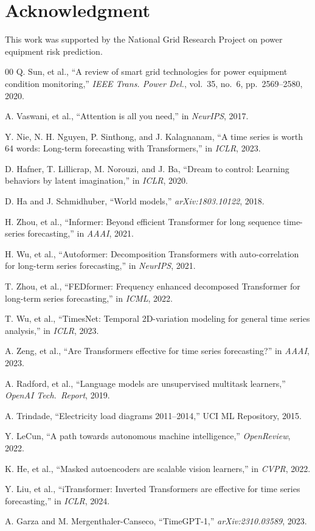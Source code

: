 \documentclass[conference]{IEEEtran}
\begin{document}
\section*{Acknowledgment}

This work was supported by the National Grid Research Project on power equipment risk prediction.

\begin{thebibliography}{00}
 Q. Sun, et al., ``A review of smart grid technologies for power equipment condition monitoring,'' \textit{IEEE Trans. Power Del.}, vol.~35, no.~6, pp.~2569--2580, 2020.

 A. Vaswani, et al., ``Attention is all you need,'' in \textit{NeurIPS}, 2017.

 Y. Nie, N. H. Nguyen, P. Sinthong, and J. Kalagnanam, ``A time series is worth 64 words: Long-term forecasting with Transformers,'' in \textit{ICLR}, 2023.

 D. Hafner, T. Lillicrap, M. Norouzi, and J. Ba, ``Dream to control: Learning behaviors by latent imagination,'' in \textit{ICLR}, 2020.

 D. Ha and J. Schmidhuber, ``World models,'' \textit{arXiv:1803.10122}, 2018.

 H. Zhou, et al., ``Informer: Beyond efficient Transformer for long sequence time-series forecasting,'' in \textit{AAAI}, 2021.

 H. Wu, et al., ``Autoformer: Decomposition Transformers with auto-correlation for long-term series forecasting,'' in \textit{NeurIPS}, 2021.

 T. Zhou, et al., ``FEDformer: Frequency enhanced decomposed Transformer for long-term series forecasting,'' in \textit{ICML}, 2022.

 T. Wu, et al., ``TimesNet: Temporal 2D-variation modeling for general time series analysis,'' in \textit{ICLR}, 2023.

 A. Zeng, et al., ``Are Transformers effective for time series forecasting?'' in \textit{AAAI}, 2023.

 A. Radford, et al., ``Language models are unsupervised multitask learners,'' \textit{OpenAI Tech.\ Report}, 2019.

 A. Trindade, ``Electricity load diagrams 2011--2014,'' UCI ML Repository, 2015.

 Y. LeCun, ``A path towards autonomous machine intelligence,'' \textit{OpenReview}, 2022.

 K. He, et al., ``Masked autoencoders are scalable vision learners,'' in \textit{CVPR}, 2022.

 Y. Liu, et al., ``iTransformer: Inverted Transformers are effective for time series forecasting,'' in \textit{ICLR}, 2024.

 A. Garza and M. Mergenthaler-Canseco, ``TimeGPT-1,'' \textit{arXiv:2310.03589}, 2023.
\end{thebibliography}
\end{document}
